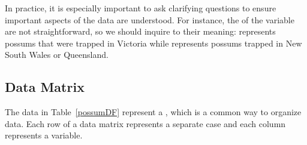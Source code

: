 In practice, it is especially important to ask clarifying questions to ensure important aspects of the data are understood. For instance, the  of the  variable are not straightforward, so we should inquire to their meaning:  represents possums that were trapped in Victoria while  represents possums trapped in New South Wales or Queensland.

\subsection{Data Matrix}

The data in Table~\ref{possumDF} represent a , %
which is a common way to organize data. Each row of a data matrix represents a separate case and each column represents a variable.

